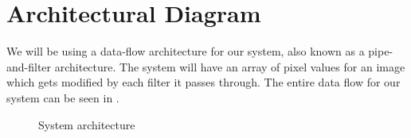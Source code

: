 \chapter{Architectural Diagram}

We will be using a data-flow architecture for our system, also known as a pipe-and-filter architecture. 
The system will have an array of pixel values for an image which gets modified by each filter it passes through.
The entire data flow for our system can be seen in .
\newline

\begin{figure}[!h]
\noindent\resizebox{\textwidth}{!}{
  
}
\caption{System architecture}
\label{fig:architecture}
\end{figure}
